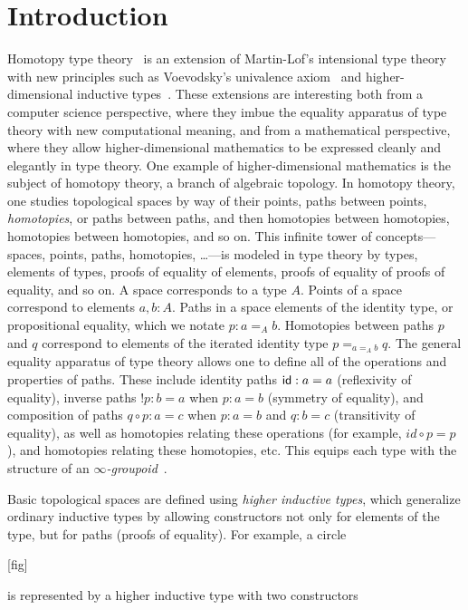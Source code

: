 \section{Introduction}

Homotopy type theory~\citep{...} is an extension of Martin-L\:of's
intensional type theory with new principles such as Voevodsky's
univalence axiom~\citep{...} and higher-dimensional inductive
types~\citep{...}.  These extensions are interesting both from a
computer science perspective, where they imbue the equality apparatus of
type theory with new computational meaning, and from a mathematical
perspective, where they allow higher-dimensional mathematics to be
expressed cleanly and elegantly in type theory.  One example of
higher-dimensional mathematics is the subject of homotopy theory, a
branch of algebraic topology.  In homotopy theory, one studies
topological spaces by way of their points, paths between points,
\emph{homotopies}, or paths between paths, and then homotopies between
homotopies, homotopies between homotopies, and so on.  This infinite
tower of concepts---spaces, points, paths, homotopies, \ldots---is
modeled in type theory by types, elements of types, proofs of equality
of elements, proofs of equality of proofs of equality, and so on.  A
space corresponds to a type $A$. Points of a space correspond to
elements $a,b : A$. Paths in a space elements of the identity type, or
propositional equality, which we notate $p : a =_A b$.  Homotopies
between paths $p$ and $q$ correspond to elements of the iterated
identity type $p =_{a =_A b} q$.  The general equality apparatus of type
theory allows one to define all of the operations and properties of
paths.  These include identity paths $\mathsf{id} : a = a$ (reflexivity of
equality), inverse paths $! p : b = a$ when $p : a = b$ (symmetry of
equality), and composition of paths $q \circ p : a = c$ when $p : a = b$ and
$q : b = c$ (transitivity of equality), as well as homotopies relating
these operations (for example, $id \circ p = p$), and homotopies
relating these homotopies, etc.  This equips each type with the
structure of an \emph{$\infty$-groupoid}~\citep{...}.  

Basic topological spaces are defined using \emph{higher inductive
  types}, which generalize ordinary inductive types by allowing
constructors not only for elements of the type, but for paths (proofs of
equality).  For example, a circle

[fig]

is represented by a higher inductive type with two constructors

